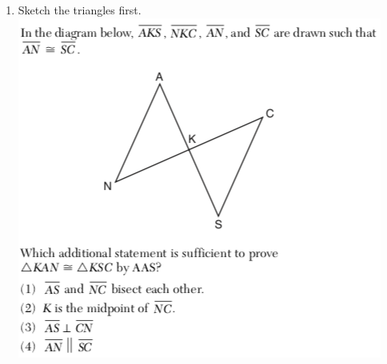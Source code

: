 \documentclass[12pt, twoside]{article}
\begin{document}
\begin{enumerate}
    \item Sketch the triangles first. \\
      \includegraphics[scale=0.8]{geom-82019-10.png}

\end{enumerate}
\end{document}
